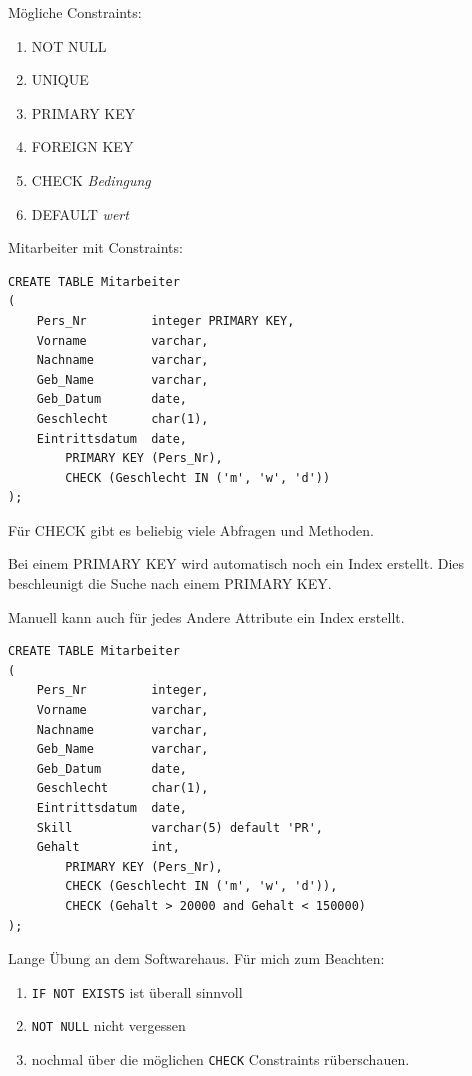\documentclass[a4paper]{article}
\begin{document}
Mögliche Constraints:

\begin{enumerate}
    \item NOT NULL
    \item UNIQUE
    \item PRIMARY KEY
    \item FOREIGN KEY
    \item CHECK \textit{Bedingung}
    \item DEFAULT \textit{wert}
\end{enumerate}

Mitarbeiter mit Constraints:

\begin{lstlisting}
CREATE TABLE Mitarbeiter
(
    Pers_Nr         integer PRIMARY KEY,
    Vorname         varchar,
    Nachname        varchar,
    Geb_Name        varchar,
    Geb_Datum       date,
    Geschlecht      char(1),
    Eintrittsdatum  date,
        PRIMARY KEY (Pers_Nr),
		CHECK (Geschlecht IN ('m', 'w', 'd'))
);
\end{lstlisting}

Für CHECK gibt es beliebig viele Abfragen und Methoden.

Bei einem PRIMARY KEY wird automatisch noch ein Index erstellt. Dies beschleunigt die Suche nach einem PRIMARY KEY.

Manuell kann auch für jedes Andere Attribute ein Index erstellt.

\begin{lstlisting}
CREATE TABLE Mitarbeiter
(
    Pers_Nr         integer,
    Vorname         varchar,
    Nachname        varchar,
    Geb_Name        varchar,
    Geb_Datum       date,
    Geschlecht      char(1),
    Eintrittsdatum  date,
	Skill			varchar(5) default 'PR',
	Gehalt			int,
        PRIMARY KEY (Pers_Nr),
		CHECK (Geschlecht IN ('m', 'w', 'd')),
		CHECK (Gehalt > 20000 and Gehalt < 150000)
);
\end{lstlisting}

Lange Übung an dem Softwarehaus. Für mich zum Beachten:

\begin{enumerate}
    \item \lstinline|IF NOT EXISTS| ist überall sinnvoll
    \item \lstinline|NOT NULL| nicht vergessen
    \item nochmal über die möglichen \lstinline|CHECK| Constraints rüberschauen.
\end{enumerate}
\end{document}
